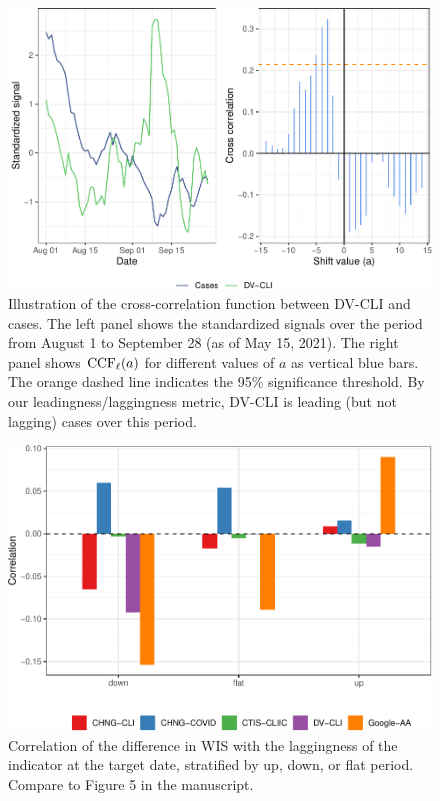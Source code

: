 \clearpage

\begin{figure}

{\centering \includegraphics[width=\textwidth]{fig/ccf-dv-finalized-1} 

}

\caption{Illustration of the cross-correlation function between DV-CLI and cases. The left panel shows the standardized signals over the period from August 1 to September 28 (as of May 15, 2021). The right panel shows $\mathrm{CCF}_{\ell}(a)$ for different values of $a$ as vertical blue bars. The orange dashed line indicates the 95\% significance threshold. By our leadingness/laggingness metric, DV-CLI is leading (but not lagging) cases over this period.}\label{fig:ccf-dv-finalized}
\end{figure}

\clearpage

\begin{figure}

{\centering \includegraphics[width=\textwidth]{fig/lagging-only-1} 

}

\caption{Correlation of the difference in WIS with the laggingness of the indicator at the target date, stratified by up, down, or flat period. Compare to Figure 5 in the manuscript.}\label{fig:lagging-only}
\end{figure}

